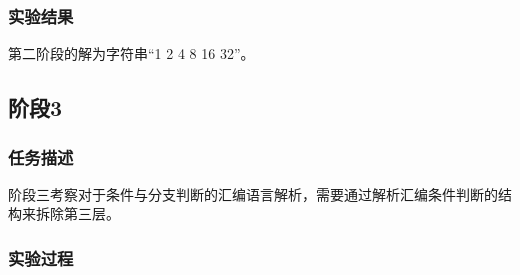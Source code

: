 \subsubsection{实验结果}
第二阶段的解为字符串``1 2 4 8 16 32''。

\subsection{阶段3}
\subsubsection{任务描述}
阶段三考察对于条件与分支判断的汇编语言解析，需要通过解析汇编条件判断的结构来拆除第三层。

\subsubsection{实验过程}
